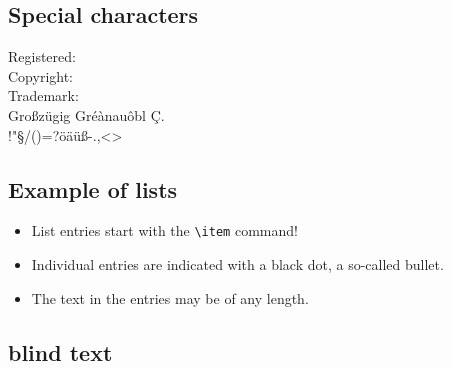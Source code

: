 \documentclass[class=scrbook, crop=false]{standalone}
\begin{document}
    \subsection{Special characters}
    Registered: \TReg\\
    Copyright: \TCop\\
    Trademark: \TTra\\
    
    Großzügig Gréànauôbl Ç.\\
    !"§/()=?öäüß-.,<>\\
    
    \subsection{Example of lists}
    \begin{itemize}
      \item List entries start with the \verb|\item| command!
      \item Individual entries are indicated with a black dot, a so-called bullet.
      \item The text in the entries may be of any length.
    \end{itemize}
    
    \subsection{blind text}
    \Blindtext
    
\end{document}
